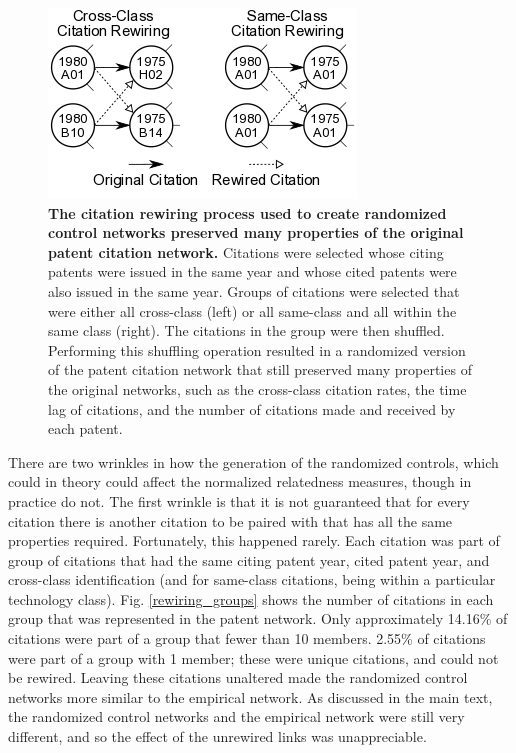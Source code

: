 \documentclass[pre,reprint,groupedaddress,superscriptaddress]{revtex4-1}
\begin{document}
\begin{figure}
\begin{center}
\includegraphics[width=\columnwidth]{figs/citation_rewiring_diagram_one_column.png} 
\end{center}
\caption{\textbf{The citation rewiring process used to create randomized control networks preserved many properties of the original patent citation network.} Citations were selected whose citing patents were issued in the same year and whose cited patents were also issued in the same year. Groups of citations were selected that were either all cross-class (left) or all same-class and all within the same class (right). The citations in the group were then shuffled. Performing this shuffling operation resulted in a randomized version of the patent citation network that still preserved many properties of the original networks, such as the cross-class citation rates, the time lag of citations, and the number of citations made and received by each patent. }\label{citation_rewiring_diagram}
\end{figure}

There are two wrinkles in how the generation of the randomized controls, which could in theory could affect the normalized relatedness measures, though in practice do not. The first wrinkle is that it is not guaranteed that for every citation there is another citation to be paired with that has all the same properties required. Fortunately, this happened rarely. Each citation was part of group of citations that had the same citing patent year, cited patent year, and cross-class identification (and for same-class citations, being within a particular technology class). Fig. \ref{rewiring_groups} shows the number of citations in each group that was represented in the patent network. Only approximately 14.16\% of citations were part of a group that fewer than 10 members. 2.55\% of citations were part of a group with 1 member; these were unique citations, and could not be rewired. Leaving these citations unaltered made the randomized control networks more similar to the empirical network. As discussed in the main text, the randomized control networks and the empirical network were still very different, and so the effect of the unrewired links was unappreciable.
\end{document}

